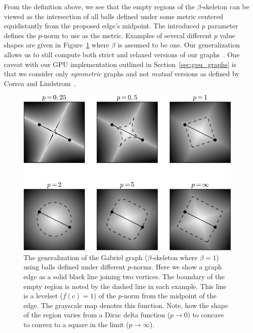 From the definition above, we see that the empty regions of the $\beta$-skeleton can be viewed as the intersection of all balls defined under some metric centered equidistantly from the proposed edge's midpoint.
%
The introduced $p$ parameter defines the $p$-norm to use as the metric.
%
Examples of several different $p$ value shapes are given in Figure~\ref{fig:gabriel_p_shapes} where $\beta$ is assumed to be one.
%
Our generalization allows us to still compute both strict and relaxed versions of our graphs~\cite{CorreaLindstrom2011}.
%
One caveat with our GPU implementation outlined in Section~\ref{sec:gpu_graphs} is that we consider only \textit{symmetric} graphs and not \textit{mutual} versions as defined by Correa and Lindstrom~\cite{CorreaLindstrom2011}.

\begin{figure}[htbp]
    \includegraphics[width=\linewidth]{figs/chap7/emptyRegions}
    \caption[Example $L_p$-norm functions]{The generalization of the Gabriel graph ($\beta$-skeleton where $\beta=1$) using balls defined under different $p$-norms.
    Here we show a graph edge as a solid black line joining two vertices.
    The boundary of the empty region is noted by the dashed line in each example.
    This line is a levelset ($f(c)=1$) of the $p$-norm from the midpoint of the edge.
    The grayscale map denotes this function.
    Note, how the shape of the region varies from a Dirac delta function ($p \rightarrow 0$) to concave to convex to a square in the limit ($p \rightarrow \infty$).}
    \label{fig:gabriel_p_shapes}
\end{figure}

